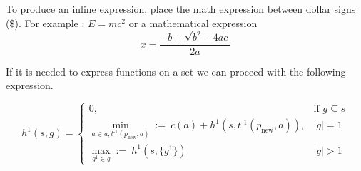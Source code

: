 \lipsum[2-6]
To produce an inline expression, place the math expression between dollar signs (\$). For example : $E=mc^2$ or a mathematical expression \[x=\frac{-b\pm\sqrt{b^2-4ac}}{2a}\]


If it is needed to express functions on a set we can proceed with the following expression.

\begin{equation*} 
h^1(s,g)=\begin{cases} 
0, &  \text{if } g \subseteq s \\ 
\min_{a \in a,t^\text{-1}(p_\text{new},a)} :=~ c(a) + h^1(s,t^\text{-1}(p_\text{new},a)), & |g| = 1 \\
\max_{g^1 \in g} :=~ h^1 (s,\{g^1\}) & |g| > 1
\end{cases} 
 \end{equation*}